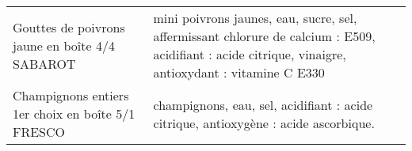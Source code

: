 \begin{longtable}{p{5cm}p{10cm}}
                                                           Gouttes de poivrons jaune en boîte 4/4 SABAROT &                                                                                                                                                                                                                                                                                                                                                                                                                                                                                                                                                                                                                                                                                                                                                                                                                                                                                     mini poivrons jaunes, eau, sucre, sel, affermissant chlorure de calcium : E509, acidifiant : acide citrique, vinaigre, antioxydant : vitamine C E330 \\
                                                        Champignons entiers 1er choix en boîte 5/1 FRESCO &                                                                                                                                                                                                                                                                                                                                                                                                                                                                                                                                                                                                                                                                                                                                                                                                                                                                                                                                                      champignons, eau, sel, acidifiant : acide citrique, antioxygène : acide ascorbique. \\

\end{longtable}
